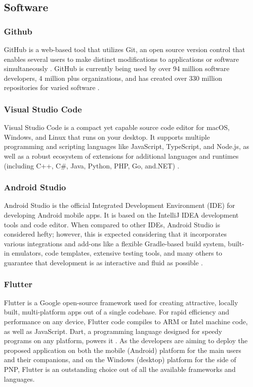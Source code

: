 \subsection{Software}

\subsubsection{Github}
GitHub is a web-based tool that utilizes Git, an open source version control that enables several users to make distinct modifications to applications or software simultaneously \cite{digitalGovGitHub}. GitHub is currently being used by over 94 million software developers, 4 million plus organizations, and has created over 330 million repositories for varied software \cite{github}.

\subsubsection{Visual Studio Code}
Visual Studio Code is a compact yet capable source code editor for macOS, Windows, and Linux that runs on your desktop. It supports multiple programming and scripting languages like JavaScript, TypeScript, and Node.js, as well as a robust ecosystem of extensions for additional languages and runtimes (including C++, C\#, Java, Python, PHP, Go, and.NET) \cite{microsoft_2021}.

\subsubsection{Android Studio}
Android Studio is the official Integrated Development Environment (IDE) for developing Android mobile apps. It is based on the IntelliJ IDEA development tools and code editor. When compared to other IDEs, Android Studio is considered hefty; however, this is expected considering that it incorporates various integrations and add-ons like a flexible Gradle-based build system, built-in emulators, code templates, extensive testing tools, and many others to guarantee that development is as interactive and fluid as possible \cite{androidStudio}.

\subsubsection{Flutter}
Flutter is a Google open-source framework used for creating attractive, locally built, multi-platform apps out of a single codebase. For rapid efficiency and performance on any device, Flutter code compiles to ARM or Intel machine code, as well as JavaScript. Dart, a programming language designed for speedy programs on any platform, powers it \cite{flutter}. As the developers are aiming to deploy the proposed application on both the mobile (Android) platform for the main users and their companions, and on the Windows (desktop)  platform for the side of PNP, Flutter is an outstanding choice out of all the available frameworks and languages.

